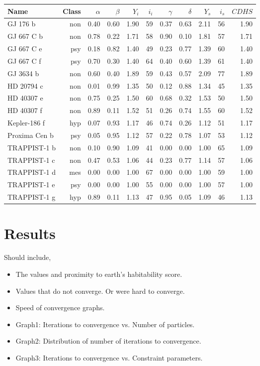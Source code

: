 \documentclass[10pt]{article}
\newenvironment{pointers}{%
  \noindent Should include,
  \begin{itemize}
    \setlength{\itemsep}{-1pt}}{%
\end{itemize}}
\begin{document}
\begin{table}
  \centering
  \begin{tabular}{l r r r r r r r r r r}
    \toprule
    Name & Class & $\alpha$ & $\beta$ & $\mathit{Y}_i$ & $i_i$ &
    $\gamma$ & $\delta$ & $\mathit{Y}_s$ & $i_s$ & $\mathit{CDHS}$\\
    \midrule
    GJ 176 b & non & 0.40 & 0.60 & 1.90 & 59 & 0.37 & 0.63 & 2.11 & 56 & 1.90\\
    GJ 667 C b & non & 0.78 & 0.22 & 1.71 & 58 & 0.90 & 0.10 & 1.81 & 57 & 1.71\\
    GJ 667 C e & psy & 0.18 & 0.82 & 1.40 & 49 & 0.23 & 0.77 & 1.39 & 60 & 1.40\\
    GJ 667 C f & psy & 0.70 & 0.30 & 1.40 & 64 & 0.40 & 0.60 & 1.39 & 61 & 1.40\\
    GJ 3634 b & non & 0.60 & 0.40 & 1.89 & 59 & 0.43 & 0.57 & 2.09 & 77 & 1.89\\
    HD 20794 c & non & 0.01 & 0.99 & 1.35 & 50 & 0.12 & 0.88 & 1.34 & 45 & 1.35\\
    HD 40307 e & non & 0.75 & 0.25 & 1.50 & 60 & 0.68 & 0.32 & 1.53 & 50 & 1.50\\
    HD 40307 f & non & 0.89 & 0.11 & 1.52 & 51 & 0.26 & 0.74 & 1.55 & 60 & 1.52\\
    Kepler-186 f & hyp & 0.07 & 0.93 & 1.17 & 46 & 0.74 & 0.26 & 1.12 & 51 & 1.17\\
    Proxima Cen b & psy & 0.05 & 0.95 & 1.12 & 57 & 0.22 & 0.78 & 1.07 & 53 & 1.12\\
    TRAPPIST-1 b & non & 0.10 & 0.90 & 1.09 & 41 & 0.00 & 0.00 & 1.00 & 65 & 1.09\\
    TRAPPIST-1 c & non & 0.47 & 0.53 & 1.06 & 44 & 0.23 & 0.77 & 1.14 & 57 & 1.06\\
    TRAPPIST-1 d & mes & 0.00 & 0.00 & 1.00 & 67 & 0.00 & 0.00 & 1.00 & 59 & 1.00\\
    TRAPPIST-1 e & psy & 0.00 & 0.00 & 1.00 & 55 & 0.00 & 0.00 & 1.00 & 57 & 1.00\\
    TRAPPIST-1 g & hyp & 0.89 & 0.11 & 1.13 & 47 & 0.95 & 0.05 & 1.09 & 46 & 1.13\\
    \bottomrule
  \end{tabular}

\end{table}



\section{Results}
\begin{pointers}
\item The values and proximity to earth's habitability score.
\item Values that do not converge. Or were hard to converge.
\item Speed of convergence graphs.
\item Graph1: Iterations to convergence vs. Number of particles.
\item Graph2: Distribution of number of iterations to convergence.
\item Graph3: Iterations to convergence vs. Constraint parameters.
\end{pointers}
\end{document}
